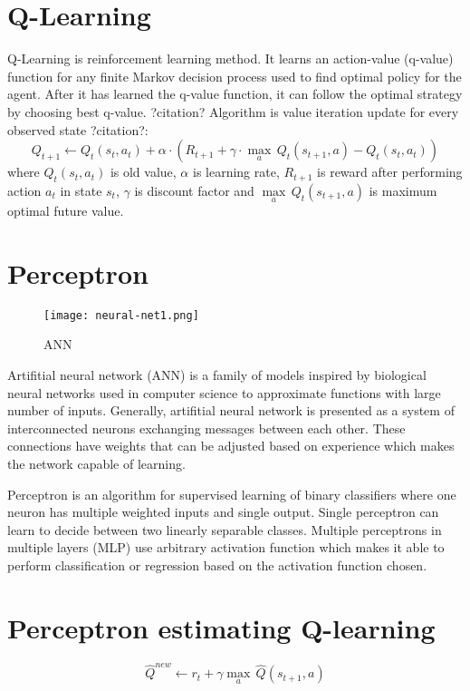 \section{Q-Learning}
Q-Learning is reinforcement learning method. It learns an action-value
(q-value) function for any finite Markov decision process used to find
optimal policy for the agent. After it has learned the q-value function,
it can follow the optimal strategy by choosing best q-value. ?citation?
Algorithm is value iteration update for every observed state ?citation?:
\begin{equation}
Q_{t+1} \leftarrow Q_t(s_t, a_t) + \alpha \cdot (
    R_{t+1} + \gamma\cdot {\max_a}\,Q_t(s_{t+1}, a) - Q_t(s_t, a_t)
)
\end{equation}
where $Q_t(s_t, a_t)$ is old value, $\alpha$ is learning rate, $R_{t+1}$ is
reward after performing action $a_t$ in state $s_t$, $\gamma$ is discount
factor and $\underset{a}{\max}\,Q_t(s_{t+1}, a)$ is maximum optimal future
value.

\section{Perceptron}
\begin{wrapfigure}{l}{0.4\textwidth}
  \vspace*{-0.45cm}
  \centering
  \texttt{[image: neural-net1.png]}
  \vspace*{-1.45cm}
  \caption{ANN}
  \label{fig:network}
  \vspace*{-1.00cm}
\end{wrapfigure}

Artifitial neural network (ANN) is a family of models inspired by biological
neural networks used in computer science to approximate functions with
large number of inputs. Generally, artifitial neural network is presented
as a system of interconnected neurons exchanging messages between each
other. These connections have weights that can be adjusted based on
experience which makes the network capable of learning.

Perceptron is an algorithm for supervised learning of binary classifiers
where one neuron has multiple weighted inputs and single output. Single
perceptron can learn to decide between two linearly separable
classes. Multiple perceptrons in multiple layers (MLP) use arbitrary
activation function which makes it able to perform classification or
regression based on the activation function chosen.

\section{Perceptron estimating Q-learning}
\begin{wrapfigure}{r}{0.42\textwidth}
  \vspace*{-1.15cm}
  \begin{equation}
    \label{eqn:otheloqupdate}
    \hat{Q}^{new}\!\leftarrow\!r_t\!+\!{\gamma}{\max_a}\,\hat{Q}(s_{t+1},\!a)
  \end{equation}
  \vspace*{-0.95cm}
\end{wrapfigure}

